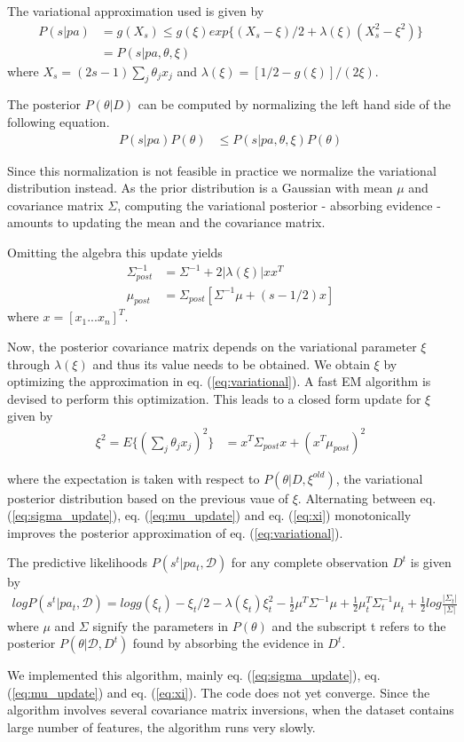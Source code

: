 The variational approximation used is given by
\begin{align}
  P(s|pa) &= g(X_s) \leq g(\xi)exp\{(X_s - \xi)/2 + \lambda(\xi)(X_s^2 - \xi^2)\}\\
  &= P(s|pa, \theta, \xi)
\end{align}
where $X_s = (2s - 1)\sum_j\theta_jx_j$ and $\lambda(\xi) = [1/2 - g(\xi)]/(2\xi)$.

The posterior $P(\theta|D)$ can be computed by normalizing the left hand side of the following equation.
\begin{align}
\label{eq:variational}
P(s|pa)P(\theta) &\leq P(s|pa, \theta, \xi)P(\theta)
\end{align}

Since this normalization is not feasible in practice we normalize the variational distribution instead. As the prior distribution is a Gaussian with mean $\mu$ and covariance matrix $\Sigma$, computing the variational posterior - absorbing evidence - amounts to updating the mean and the covariance matrix. 

Omitting the algebra this update yields 
\begin{align}
\label{eq:sigma_update}
\Sigma^{-1}_{post} &= \Sigma^{-1} + 2|\lambda(\xi)|xx^T\\
\label{eq:mu_update}
\mu_{post} &= \Sigma_{post}[\Sigma^{-1}\mu + (s - 1/2)x]
\end{align}
where $x = [x_1 ...x_n]^T$. 

Now, the posterior covariance matrix depends on the variational parameter $\xi$ through $\lambda(\xi)$ and thus its value needs to be obtained. We obtain $\xi$ by optimizing the approximation in eq. (\ref{eq:variational}). A fast EM algorithm is devised to perform this optimization. This leads to a closed form update for $\xi$ given by 
\begin{align}
\label{eq:xi}
\xi^2 = E\{(\sum_j\theta_jx_j)^2\} &= x^T\Sigma_{post}x + (x^T\mu_{post})^2
\end{align}

where the expectation is taken with respect to $P(\theta|D, \xi^{old})$, the variational posterior distribution based on the previous vaue of $\xi$. Alternating between eq. (\ref{eq:sigma_update}), eq. (\ref{eq:mu_update}) and eq. (\ref{eq:xi}) monotonically improves the posterior approximation of eq. (\ref{eq:variational}).

The predictive likelihoods $P(s^t | pa_t, \mathcal{D})$ for any complete observation $D^t$ is given by
\begin{align}
  logP(s^t|pa_t, \mathcal{D}) = logg(\xi_t) - \xi_t/2 - \lambda(\xi_t)\xi_t^2 - \frac{1}{2}\mu^T\Sigma^{-1}\mu + \frac{1}{2}\mu^T_t\Sigma^{-1}_t\mu_t + \frac{1}{2}log\frac{|\Sigma_t|}{|\Sigma|}
\end{align}
where $\mu$ and $\Sigma$ signify the parameters in $P(\theta)$ and the subscript t refers to the posterior $P(\theta|\mathcal{D}, D^t)$ found by absorbing the evidence in $D^t$.

We implemented this algorithm, mainly eq. (\ref{eq:sigma_update}), eq. (\ref{eq:mu_update}) and eq. (\ref{eq:xi}). The code does not yet converge. Since the algorithm involves several covariance matrix inversions, when the dataset contains large number of features, the algorithm runs very slowly.
